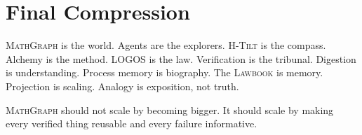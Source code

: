 \documentclass[11pt,a4paper]{article}
\newcommand{\MG}{\textsc{MathGraph}}
\newcommand{\LOGOS}{\textsc{LOGOS}}
\newcommand{\Lawbook}{\textsc{Lawbook}}
\newcommand{\HTilt}{\textsc{H-Tilt}}
\begin{document}
\section{Final Compression}
\MG{} is the world. Agents are the explorers. \HTilt{} is the compass. Alchemy is the method. \LOGOS{} is the law. Verification is the tribunal. Digestion is understanding. Process memory is biography. The \Lawbook{} is memory. Projection is scaling. Analogy is exposition, not truth.

\MG{} should not scale by becoming bigger. It should scale by making every verified thing reusable and every failure informative.
\end{document}
